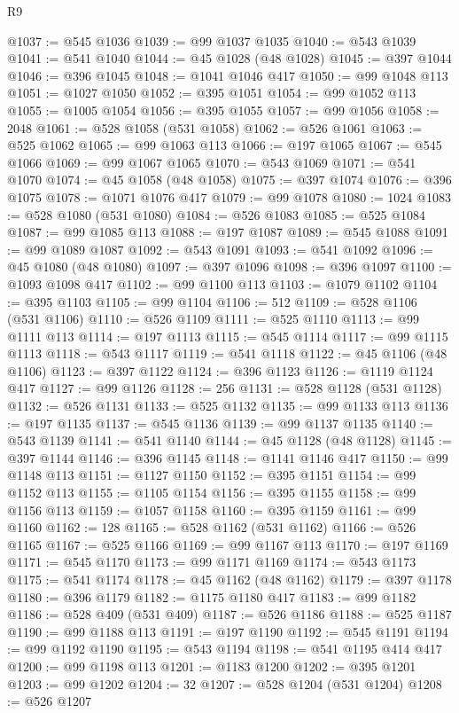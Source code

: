 \begin{lexlean}{R9}
\begin{coremodule}
@1037 := @545 @1036
@1039 := @99 @1037 @1035
@1040 := @543 @1039
@1041 := @541 @1040
@1044 := @45 @1028 (@48 @1028)
@1045 := @397 @1044
@1046 := @396 @1045
@1048 := @1041 @1046 @417
@1050 := @99 @1048 @113
@1051 := @1027 @1050
@1052 := @395 @1051
@1054 := @99 @1052 @113
@1055 := @1005 @1054
@1056 := @395 @1055
@1057 := @99 @1056
@1058 := 2048
@1061 := @528 @1058 (@531 @1058)
@1062 := @526 @1061
@1063 := @525 @1062
@1065 := @99 @1063 @113
@1066 := @197 @1065
@1067 := @545 @1066
@1069 := @99 @1067 @1065
@1070 := @543 @1069
@1071 := @541 @1070
@1074 := @45 @1058 (@48 @1058)
@1075 := @397 @1074
@1076 := @396 @1075
@1078 := @1071 @1076 @417
@1079 := @99 @1078
@1080 := 1024
@1083 := @528 @1080 (@531 @1080)
@1084 := @526 @1083
@1085 := @525 @1084
@1087 := @99 @1085 @113
@1088 := @197 @1087
@1089 := @545 @1088
@1091 := @99 @1089 @1087
@1092 := @543 @1091
@1093 := @541 @1092
@1096 := @45 @1080 (@48 @1080)
@1097 := @397 @1096
@1098 := @396 @1097
@1100 := @1093 @1098 @417
@1102 := @99 @1100 @113
@1103 := @1079 @1102
@1104 := @395 @1103
@1105 := @99 @1104
@1106 := 512
@1109 := @528 @1106 (@531 @1106)
@1110 := @526 @1109
@1111 := @525 @1110
@1113 := @99 @1111 @113
@1114 := @197 @1113
@1115 := @545 @1114
@1117 := @99 @1115 @1113
@1118 := @543 @1117
@1119 := @541 @1118
@1122 := @45 @1106 (@48 @1106)
@1123 := @397 @1122
@1124 := @396 @1123
@1126 := @1119 @1124 @417
@1127 := @99 @1126
@1128 := 256
@1131 := @528 @1128 (@531 @1128)
@1132 := @526 @1131
@1133 := @525 @1132
@1135 := @99 @1133 @113
@1136 := @197 @1135
@1137 := @545 @1136
@1139 := @99 @1137 @1135
@1140 := @543 @1139
@1141 := @541 @1140
@1144 := @45 @1128 (@48 @1128)
@1145 := @397 @1144
@1146 := @396 @1145
@1148 := @1141 @1146 @417
@1150 := @99 @1148 @113
@1151 := @1127 @1150
@1152 := @395 @1151
@1154 := @99 @1152 @113
@1155 := @1105 @1154
@1156 := @395 @1155
@1158 := @99 @1156 @113
@1159 := @1057 @1158
@1160 := @395 @1159
@1161 := @99 @1160
@1162 := 128
@1165 := @528 @1162 (@531 @1162)
@1166 := @526 @1165
@1167 := @525 @1166
@1169 := @99 @1167 @113
@1170 := @197 @1169
@1171 := @545 @1170
@1173 := @99 @1171 @1169
@1174 := @543 @1173
@1175 := @541 @1174
@1178 := @45 @1162 (@48 @1162)
@1179 := @397 @1178
@1180 := @396 @1179
@1182 := @1175 @1180 @417
@1183 := @99 @1182
@1186 := @528 @409 (@531 @409)
@1187 := @526 @1186
@1188 := @525 @1187
@1190 := @99 @1188 @113
@1191 := @197 @1190
@1192 := @545 @1191
@1194 := @99 @1192 @1190
@1195 := @543 @1194
@1198 := @541 @1195 @414 @417
@1200 := @99 @1198 @113
@1201 := @1183 @1200
@1202 := @395 @1201
@1203 := @99 @1202
@1204 := 32
@1207 := @528 @1204 (@531 @1204)
@1208 := @526 @1207

\end{coremodule}
\end{lexlean}
